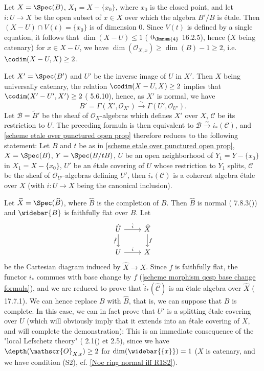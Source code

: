Let $X=\Spec(B)$, $X_1=X-\{x_0\}$, where $x_0$ is the closed point, and let $i:U\to X$ be the open subset of $x\in X$ over which the algebra $B'/B$ is \'etale. Then $(X-U)\cap V(t)=\{x_0\}$  is of dimension $0$. Since $V(t)$ is defined by a single equation, it follows that $\dim(X-U)\leq 1$ (\cite{EGA4-1} $0_{\text{\Rmnum{4}}}$ 16.2.5), hence ($X$ being catenary) for $x\in X-U$, we have $\dim(\mathscr{O}_{X,x})\geq \dim(B)-1\geq 2$, i.e. $\codim(X-U,X)\geq 2$.\par
Let $X'=\Spec(B')$ and $U'$ be the inverse image of $U$ in $X'$. Then $X$ being universally catenary, the relation $\codim(X-U,X)\geq 2$ implies that $\codim(X'-U',X')\geq 2$ (\cite{EGA4-2} 5.6.10), hence, as $X'$ is normal, we have
\[B'=\Gamma(X',\mathscr{O}_{X'})\stackrel{\sim}{\to}\Gamma(U',\mathscr{O}_{U'}).\]
Let $\mathscr{B}=\widetilde{B}'$ be the sheaf of $\mathscr{O}_X$-algebras which defines $X'$ over $X$, $\mathscr{C}$ be its restriction to $U$. The preceding formula is then equivalent to $\mathscr{B}\stackrel{\sim}{\to} i_*(\mathscr{C})$, and \cref{scheme etale over punctured open prop} therefore reduces to the following statement: Let $B$ and $t$ be as in \cref{scheme etale over punctured open prop}, $X=\Spec(B)$, $Y=\Spec(B/tB)$, $U$ be an open neighborhood of $Y_1=Y-\{x_0\}$ in $X_1=X-\{x_0\}$, $U'$ be an \'etale covering of $U$ whose restriction to $Y_1$ splits, $\mathcal{C}$ be the sheaf of $\mathscr{O}_{U'}$-algebras defining $U'$, then $i_*(\mathscr{C})$ is a coherent algebra \'etale over $X$ (with $i:U\to X$ being the canonical inclusion).\par
Let $\widehat{X}=\Spec(\widehat{B})$, where $\widehat{B}$ is the completion of $B$. Then $\widehat{B}$ is normal (\cite{EGA4-3} 7.8.3()) and $\widebar{B}$ is faithfully flat over $B$. Let
\[\begin{tikzcd}
\widehat{U}\ar[d,swap,"\hat{f}"]\ar[r,"\hat{i}"]&\widehat{X}\ar[d,"f"]\\
U\ar[r,"i"]&X
\end{tikzcd}\]
be the Cartesian diagram induced by $\widehat{X}\to X$. Since $f$ is faithfully flat, the functor $i_*$ commues with base change by $f$ (\cref{scheme morphism qcsp base change formula}), and we are reduced to prove that $\hat{i}_*(\widehat{\mathscr{C}})$ is an \'etale algebra over $\widehat{X}$ (\cite{EGA4-4} 17.7.1). We can hence replace $B$ with $\widehat{B}$, that is, we can suppose that $B$ is complete. In this case, we can in fact prove that $U'$ is a splitting \'etale covering over $U$ (which will obviously imply that it extends into an \'etale covering of $X$, and will complete the demonstration): This is an immediate consequence of the "local Lefschetz theory" (\cite{SGA2}  2.1() et 2.5), since we have $\depth(\mathscr{O}_{X,x})\geq 2$ for $\dim(\widebar{\{x\}})=1$ ($X$ is catenary, and we have condition (S2), cf. \cref{Noe ring normal iff R1S2}).


